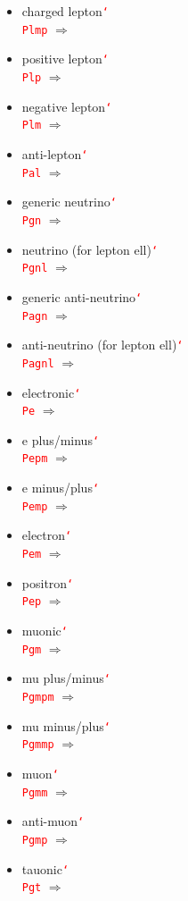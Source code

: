 \documentclass[12pt]{article}
\newcommand{\texcmd}[1]{\textcolor{red}{\texttt{\char`\\#1}}}
\begin{document}
\begin{multicols}{2}
{\begin{itemize}
\item charged lepton\newline \texcmd{Plmp} $\Rightarrow$ \Plmp
\item positive lepton\newline \texcmd{Plp} $\Rightarrow$ \Plp
\item negative lepton\newline \texcmd{Plm} $\Rightarrow$ \Plm
\item anti-lepton\newline \texcmd{Pal} $\Rightarrow$ \Pal
\item generic neutrino\newline \texcmd{Pgn} $\Rightarrow$ \Pgn
\item neutrino (for lepton ell)\newline \texcmd{Pgnl} $\Rightarrow$ \Pgnl
\item generic anti-neutrino\newline \texcmd{Pagn} $\Rightarrow$ \Pagn
\item anti-neutrino (for lepton ell)\newline \texcmd{Pagnl} $\Rightarrow$ \Pagnl
\item electronic\newline \texcmd{Pe} $\Rightarrow$ \Pe
\item e plus/minus\newline \texcmd{Pepm} $\Rightarrow$ \Pepm
\item e minus/plus\newline \texcmd{Pemp} $\Rightarrow$ \Pemp
\item electron\newline \texcmd{Pem} $\Rightarrow$ \Pem
\item positron\newline \texcmd{Pep} $\Rightarrow$ \Pep
\item muonic\newline \texcmd{Pgm} $\Rightarrow$ \Pgm
\item mu plus/minus\newline \texcmd{Pgmpm} $\Rightarrow$ \Pgmpm
\item mu minus/plus\newline \texcmd{Pgmmp} $\Rightarrow$ \Pgmmp
\item muon\newline \texcmd{Pgmm} $\Rightarrow$ \Pgmm
\item anti-muon\newline \texcmd{Pgmp} $\Rightarrow$ \Pgmp
\item tauonic\newline \texcmd{Pgt} $\Rightarrow$ \Pgt

\end{itemize}}
\end{multicols}
\end{document}
